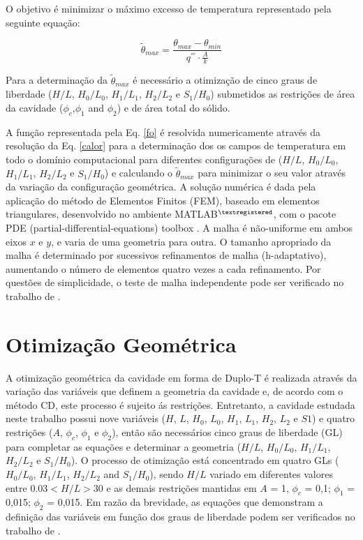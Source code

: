 \documentclass[12pt,A4,A4pt]{article}
\begin{document}
O objetivo é minimizar o máximo excesso de temperatura representado pela seguinte equação:

\begin{equation}
\tilde{\theta}_{max}=\frac{\theta_{max}-\theta_{min}}{q^{'''}\cdot\frac{A}{k}}\label{fo}
\end{equation}

Para a determinação da $\tilde{\theta}_{max}$ é necessário a otimização de cinco graus de liberdade ($H/L$, $H_{0}/L_{0}$, $H_{1}/L_{1}$, $H_{2}/L_{2}$ e $S_{1}/H_{0}$) submetidos as restrições de área da cavidade ($\phi_{c}$,$\phi_{1}$ and $\phi_{2}$) e de área total do sólido.

A função representada pela Eq. \ref{fo} é resolvida numericamente através da resolução da Eq. \ref{calor} para a determinação dos os campos de temperatura em todo o domínio computacional para diferentes configurações de ($H/L$, $H_{0}/L_{0}$, $H_{1}/L_{1}$, $H_{2}/L_{2}$ e $S_{1}/H_{0}$) e calculando o $\tilde{\theta}_{max}$ para minimizar o seu valor através da variação da configuração geométrica. A solução numérica é dada pela aplicação do método de Elementos Finitos (FEM), baseado em elementos triangulares, desenvolvido no ambiente MATLAB$^{\tiny ®}$, com o pacote PDE (partial-differential-equations) toolbox . A malha é não-uniforme em ambos eixos $x$ e $y$, e varia de uma geometria para outra. O tamanho apropriado da malha é determinado por sucessivos refinamentos de malha (h-adaptativo), aumentando o número de elementos quatro vezes a cada refinamento. Por questões de simplicidade, o teste de malha independente pode ser verificado no trabalho de \cite{Gonzales2015cilamce}.

\section{Otimização Geométrica}
\label{opt}
\hspace{0.5cm}A otimização geométrica da cavidade em forma de Duplo-T é realizada através da variação das variáveis que definem a geometria da cavidade e, de acordo com o método CD, este processo é sujeito ás restrições. Entretanto, a cavidade estudada neste trabalho possui nove variáveis ($H$, $L$, $H_{0}$, $L_{0}$, $H_{1}$, $L_{1}$, $H_{2}$, $L_{2}$ e $S1$) e quatro restrições ($A$, $\phi_{c}$, $\phi_{1}$ e $\phi_{2}$), então são necessários cinco graus de liberdade (GL) para completar as equações e determinar a geometria ($H/L$, $H_{0}/L_{0}$, $H_{1}/L_{1}$, $H_{2}/L_{2}$ e $S_{1}/H_{0}$). O processo de otimização está concentrado em quatro GLs ( $H_{0}/L_{0}$, $H_{1}/L_{1}$, $H_{2}/L_{2}$ and $S_{1}/H_{0}$), sendo $H/L$ variado em diferentes valores entre $0.03< H/L >30$ e as demais restrições mantidas em $A$ = 1, $\phi_{c}$ = 0,1; $\phi_{1}$ = 0,015; $\phi_{2}$ = 0,015. Em razão da brevidade, as equações que demonstram a definição das variáveis em função dos graus de liberdade podem ser verificados no trabalho de .
\end{document}
